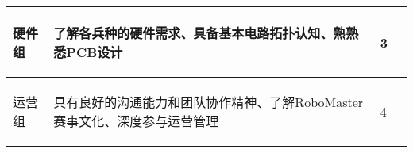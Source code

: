 \begin{longtable}{X | X | X | X}
    \hline

        \begin{center}
            硬件组
        \end{center} &
        了解各兵种的硬件需求、具备基本电路拓扑认知、熟熟悉PCB设计 &
        \begin{center}
            3
        \end{center}&
        \\

    \hline

        \begin{center}
            运营组
        \end{center} &
        具有良好的沟通能力和团队协作精神、了解RoboMaster赛事文化、深度参与运营管理 &
        \begin{center}
            4
        \end{center}&
        \\

    \hline
    
\end{longtable}